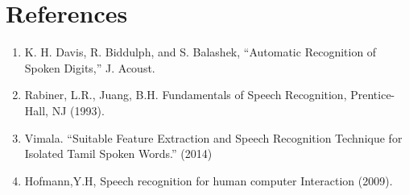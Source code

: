 \documentclass[12pt, a4paper, twoside]{report}
\begin{document}
\section*{References}
\begin{enumerate}[label=(\arabic*), noitemsep]
\item K. H. Davis, R. Biddulph, and S. Balashek, ``Automatic Recognition of Spoken Digits,'' 
J. Acoust.
\item Rabiner, L.R., Juang, B.H. Fundamentals of Speech Recognition, Prentice-Hall, NJ (1993).
\item Vimala. ``Suitable Feature Extraction and Speech Recognition Technique for Isolated Tamil Spoken Words.'' (2014)
\item Hofmann,Y.H, Speech recognition for human computer Interaction (2009).
\end{enumerate}
\end{document}
